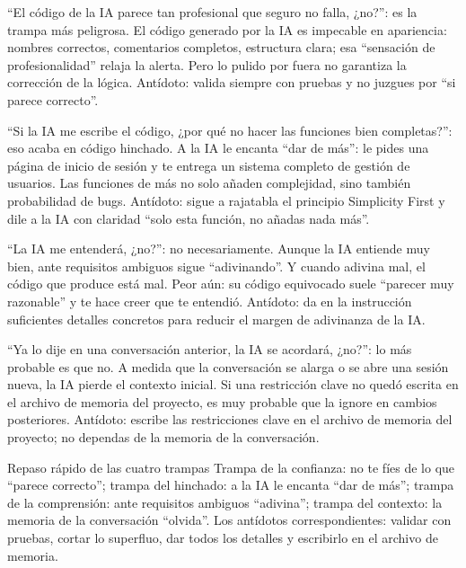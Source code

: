 “El código de la IA parece tan profesional que seguro no falla, ¿no?”: es la trampa más peligrosa. El código generado por la IA es impecable en apariencia: nombres correctos, comentarios completos, estructura clara; esa “sensación de profesionalidad” relaja la alerta. Pero lo pulido por fuera no garantiza la corrección de la lógica. Antídoto: valida siempre con pruebas y no juzgues por “si parece correcto”.


“Si la IA me escribe el código, ¿por qué no hacer las funciones bien completas?”: eso acaba en código hinchado. A la IA le encanta “dar de más”: le pides una página de inicio de sesión y te entrega un sistema completo de gestión de usuarios. Las funciones de más no solo añaden complejidad, sino también probabilidad de bugs. Antídoto: sigue a rajatabla el principio Simplicity First y dile a la IA con claridad “solo esta función, no añadas nada más”.


“La IA me entenderá, ¿no?”: no necesariamente. Aunque la IA entiende muy bien, ante requisitos ambiguos sigue “adivinando”. Y cuando adivina mal, el código que produce está mal. Peor aún: su código equivocado suele “parecer muy razonable” y te hace creer que te entendió. Antídoto: da en la instrucción suficientes detalles concretos para reducir el margen de adivinanza de la IA.


“Ya lo dije en una conversación anterior, la IA se acordará, ¿no?”: lo más probable es que no. A medida que la conversación se alarga o se abre una sesión nueva, la IA pierde el contexto inicial. Si una restricción clave no quedó escrita en el archivo de memoria del proyecto, es muy probable que la ignore en cambios posteriores. Antídoto: escribe las restricciones clave en el archivo de memoria del proyecto; no dependas de la memoria de la conversación.

\begin{tcbwarn}{Repaso rápido de las cuatro trampas}
Trampa de la confianza: no te fíes de lo que “parece correcto”; trampa del hinchado: a la IA le encanta “dar de más”; trampa de la comprensión: ante requisitos ambiguos “adivina”; trampa del contexto: la memoria de la conversación “olvida”. Los antídotos correspondientes: validar con pruebas, cortar lo superfluo, dar todos los detalles y escribirlo en el archivo de memoria.

\end{tcbwarn}

